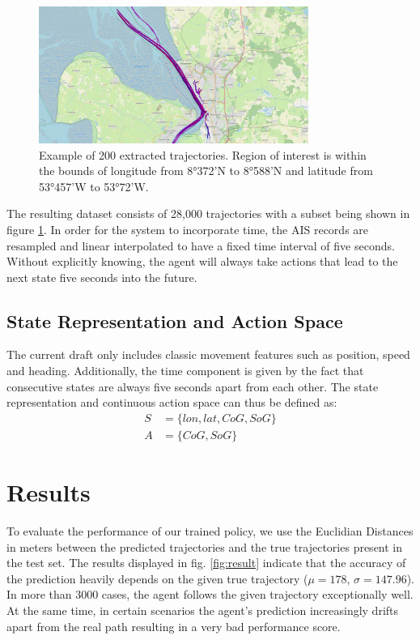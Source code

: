 \documentclass[conference]{IEEEtran}
\begin{document}
\begin{figure}[t]
\centerline{\includegraphics[width=250pt]{images/tracks.PNG}}
\caption{Example of 200 extracted trajectories. Region of interest is within the bounds of longitude from 8°372'N to 8°588'N and latitude from 53°457'W to 53°72'W.}
\label{fig:tracks}
\end{figure}
The resulting dataset consists of 28,000 trajectories with a subset being shown in figure \ref{fig:tracks}. In order for the system to incorporate time, the AIS records are resampled and linear interpolated to have a fixed time interval of five seconds. Without explicitly knowing, the agent will always take actions that lead to the next state five seconds into the future.

\subsection{State Representation and Action Space}
The current draft only includes classic movement features such as position, speed and heading. Additionally, the time component is given by the fact that consecutive states are always five seconds apart from each other. The state representation and continuous action space can thus be defined as:
\begin{equation}
    \begin{aligned}
        S &= \{lon, lat, CoG, SoG\} \\
        A &= \{CoG, SoG\}
    \end{aligned}
\end{equation}

\section{Results}
To evaluate the performance of our trained policy, we use the Euclidian Distances in meters between the predicted trajectories and the true trajectories present in the test set. The results displayed in fig. \ref{fig:result} indicate that the accuracy of the prediction heavily depends on the given true trajectory ($\mu=178$, $\sigma=147.96$). In more than 3000 cases, the agent follows the given trajectory exceptionally well. At the same time, in certain scenarios the agent's prediction increasingly drifts apart from the real path resulting in a very bad performance score.
\end{document}
